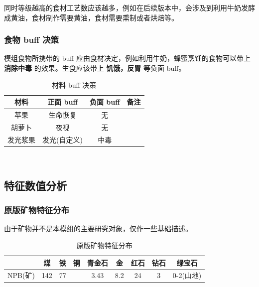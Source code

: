 同时等级越高的食材工艺数应该越多，例如在后续版本中，会涉及到利用牛奶发酵成黄油，食材制作需要黄油，食材需要熏制或者烘焙等。

\subsubsection{食物 buff 决策}

模组食物所携带的 buff 应由食材决定，例如利用牛奶，蜂蜜烹饪的食物可以带上 \textbf{消除中毒} 的效果。生食应该带上 \textbf{饥饿，反胃} 等负面 buff。

\begin{center}
    \setlength{\tabcolsep}{4mm}
    \begin{longtable}{c|c|c|c}
        \caption{材料 buff 决策} \\
        \toprule
        \textbf{材料} & \textbf{正面 buff} & \textbf{负面 buff} & 备注 \\
        \midrule
        苹果 & 生命恢复 & 无 & \\
        胡萝卜 & 夜视 & 无 & \\
        发光浆果 & 发光(自定义) & 中毒 \\
        \bottomrule
    \end{longtable}
\end{center}

\

\subsection{特征数值分析}
\subsubsection{原版矿物特征分布}

由于矿物并不是本模组的主要研究对象，仅作一些基础描述。

\begin{table}[H]
    \centering
    \caption{原版矿物特征分布}
    \label{table:原版矿物特征分布}
    \setlength{\tabcolsep}{4mm}
    \begin{tabular}{c|cccccccc}
        \toprule
        \textbf{} & \textbf{煤} & \textbf{铁} & \textbf{铜} & \textbf{青金石} & \textbf{金} & \textbf{红石} & \textbf{钻石} & \textbf{绿宝石} \\
        \midrule
        NPB(矿) & 142 & 77 &  & 3.43 & 8.2 & 24 & 3 & 0-2(山地) \\
        \bottomrule
    \end{tabular}
\end{table}
\newpage